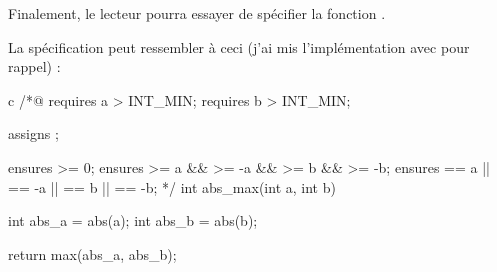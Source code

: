 Finalement, le lecteur pourra essayer de spécifier la fonction .



La spécification peut ressembler à ceci (j'ai mis l'implémentation avec pour
rappel) :



\begin{CodeBlock}{c}
/*@
  requires a > INT_MIN;
  requires b > INT_MIN;

  assigns \nothing;

  ensures \result >= 0;
  ensures \result >= a && \result >= -a && \result >= b && \result >= -b;
  ensures \result == a || \result == -a || \result == b || \result == -b;
*/
int abs_max(int a, int b){
  int abs_a = abs(a);
  int abs_b = abs(b);

  return max(abs_a, abs_b);
}
\end{CodeBlock}
